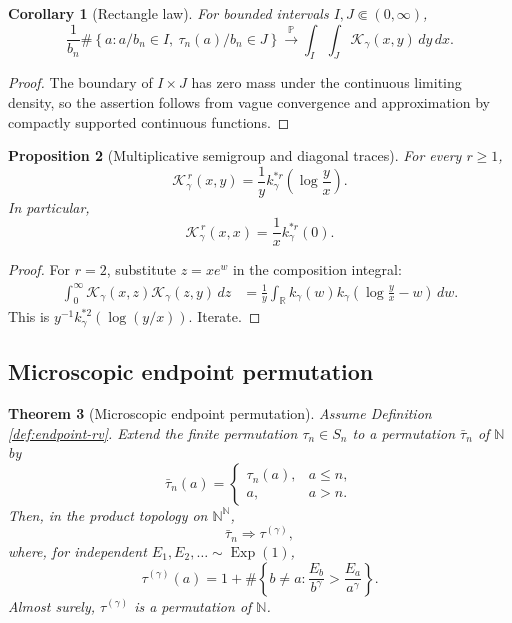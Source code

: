 \documentclass[11pt]{article}
\newtheorem{theorem}{Theorem}[section]
\newtheorem{proposition}[theorem]{Proposition}
\newtheorem{corollary}[theorem]{Corollary}
\theoremstyle{remark}
\newcommand{\Pp}{\mathbb P}
\newcommand{\Exp}{\operatorname{Exp}}
\newcommand{\dd}{\,d}
\begin{document}
\begin{corollary}[Rectangle law]
\label{cor:endpoint-tangent-rectangles}
For bounded intervals $I,J\Subset(0,\infty)$,
\[
        \frac1{b_n}\#\left\{a:
        a/b_n\in I,\ \tau_n(a)/b_n\in J\right\}
        \xrightarrow{\Pp}
        \int_I\int_J\mathcal K_\gamma(x,y)\dd y\dd x.
\]
\end{corollary}

\begin{proof}
The boundary of $I\times J$ has zero mass under the continuous limiting
density, so the assertion follows from vague convergence and approximation by
compactly supported continuous functions.
\end{proof}

\begin{proposition}[Multiplicative semigroup and diagonal traces]
\label{prop:endpoint-kernel-powers}
For every $r\ge1$,
\[
        \mathcal K_\gamma^{\,r}(x,y)
        =\frac1y k_\gamma^{*r}\!\left(\log\frac yx\right).
\]
In particular,
\[
        \mathcal K_\gamma^{\,r}(x,x)
        =\frac1x k_\gamma^{*r}(0).
\]
\end{proposition}

\begin{proof}
For $r=2$, substitute $z=xe^w$ in the composition integral:
\[
\begin{aligned}
        \int_0^\infty\mathcal K_\gamma(x,z)
        \mathcal K_\gamma(z,y)\dd z
        &=\frac1y\int_{\mathbb R}k_\gamma(w)
        k_\gamma\!\left(\log\frac yx-w\right)\dd w.
\end{aligned}
\]
This is $y^{-1}k_\gamma^{*2}(\log(y/x))$.  Iterate.
\end{proof}


\subsection{Microscopic endpoint permutation}\label{subsec:microscopic-endpoint}

\begin{theorem}[Microscopic endpoint permutation]
\label{thm:microscopic-endpoint-permutation}
Assume Definition \ref{def:endpoint-rv}.  Extend the finite permutation
\(\tau_n\in S_n\) to a permutation \(\bar\tau_n\) of \(\mathbb N\) by
\[
        \bar\tau_n(a)=
        \begin{cases}
        \tau_n(a),&a\le n,\\
        a,&a>n.
        \end{cases}
\]
Then, in the product topology on \(\mathbb N^{\mathbb N}\),
\[
        \bar\tau_n\Rightarrow\tau^{(\gamma)},
\tag{8.53}\label{eq:microscopic-endpoint-convergence}
\]
where, for independent \(E_1,E_2,\ldots\sim\Exp(1)\),
\[
        \tau^{(\gamma)}(a)
        =1+\#\left\{b\ne a:
        \frac{E_b}{b^\gamma}>\frac{E_a}{a^\gamma}\right\}.
\]
Almost surely, \(\tau^{(\gamma)}\) is a permutation of \(\mathbb N\).
\end{theorem}
\end{document}
